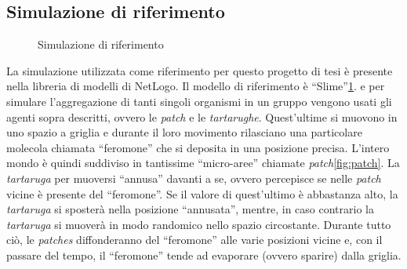 \subsection{Simulazione di riferimento}\label{refSim}
\begin{figure}[ht]
    \centering
    \caption{Simulazione di riferimento}\label{fig:refsimfoto}
\end{figure}
La simulazione utilizzata come riferimento per questo progetto di tesi è presente nella libreria
di modelli di NetLogo. Il modello di riferimento è ``Slime''\space\cite{wilensky1997netlogo}\space\cref{fig:refsimfoto}.
e per simulare l'aggregazione di tanti singoli organismi in un gruppo vengono usati gli agenti sopra descritti, 
ovvero le \textit{patch} e le \textit{tartarughe}.
Quest'ultime si muovono in uno spazio a griglia e durante il loro movimento rilasciano una particolare molecola
chiamata ``feromone'' che si deposita in una posizione precisa. L'intero mondo è quindi suddiviso
in tantissime ``micro-aree'' chiamate \textit{patch}\space\cref{fig:patch}. La \textit{tartaruga} per muoversi 
``annusa'' davanti a se, ovvero percepisce se nelle \textit{patch} vicine è presente del ``feromone''. Se il valore di quest'ultimo è abbastanza alto, la 
\textit{tartaruga} si sposterà nella posizione ``annusata'', mentre, in caso contrario la \textit{tartaruga} si muoverà in modo randomico nello spazio circostante. 
Durante tutto ciò, le \textit{patches} diffonderanno del ``feromone'' alle varie posizioni vicine e, con il passare del tempo,
il ``feromone'' tende ad evaporare (ovvero sparire) dalla griglia.

